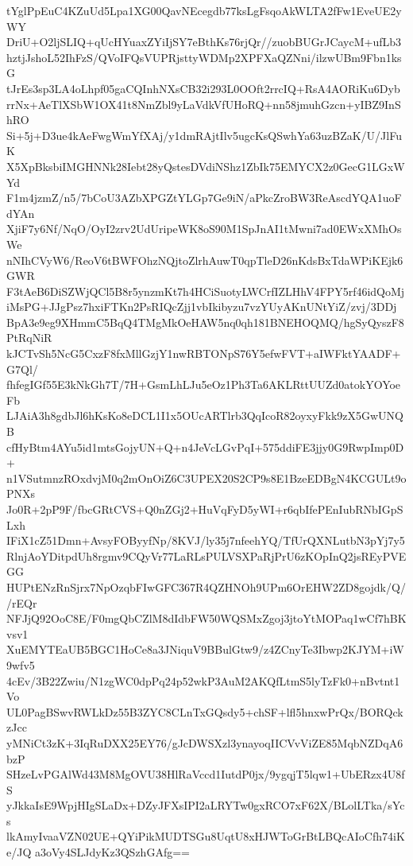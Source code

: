 tYglPpEuC4KZuUd5Lpa1XG00QavNEcegdb77ksLgFsqoAkWLTA2fFw1EveUE2yWY
DriU+O2ljSLIQ+qUcHYuaxZYiIjSY7eBthKs76rjQr//zuobBUGrJCaycM+ufLb3
hztjJshoL52IhFzS/QVoIFQsVUPRjsttyWDMp2XPFXaQZNni/ilzwUBm9Fbn1ksG
tJrEs3sp3LA4oLhpf05gaCQInhNXsCB32i293L0OOft2rrcIQ+RsA4AORiKu6Dyb
rrNx+AeTlXSbW1OX41t8NmZbl9yLaVdkVfUHoRQ+nn58jmuhGzcn+yIBZ9InShRO
Si+5j+D3ue4kAeFwgWmYfXAj/y1dmRAjtIlv5ugcKsQSwhYa63uzBZaK/U/JlFuK
X5XpBksbiIMGHNNk28Iebt28yQstesDVdiNShz1ZbIk75EMYCX2z0GecG1LGxWYd
F1m4jzmZ/n5/7bCoU3AZbXPGZtYLGp7Ge9iN/aPkcZroBW3ReAscdYQA1uoFdYAn
XjiF7y6Nf/NqO/OyI2zrv2UdUripeWK8oS90M1SpJnAI1tMwni7ad0EWxXMhOsWe
nNIhCVyW6/ReoV6tBWFOhzNQjtoZlrhAuwT0qpTleD26nKdsBxTdaWPiKEjk6GWR
F3tAeB6DiSZWjQCl5B8r5ynzmKt7h4HCiSuotyLWCrfIZLHhV4FPY5rf46idQoMj
iMsPG+JJgPsz7hxiFTKn2PsRIQcZjj1vbIkibyzu7vzYUyAKnUNtYiZ/zvj/3DDj
BpA3e9eg9XHmmC5BqQ4TMgMkOeHAW5nq0qh181BNEHOQMQ/hgSyQyszF8PtRqNiR
kJCTvSh5NcG5CxzF8fxMllGzjY1nwRBTONpS76Y5efwFVT+aIWFktYAADF+G7Ql/
fhfegIGf55E3kNkGh7T/7H+GsmLhLJu5eOz1Ph3Ta6AKLRttUUZd0atokYOYoeFb
LJAiA3h8gdbJl6hKsKo8eDCL1I1x5OUcARTlrb3QqIcoR82oyxyFkk9zX5GwUNQB
cfHyBtm4AYu5id1mtsGojyUN+Q+n4JeVcLGvPqI+575ddiFE3jjy0G9RwpImp0D+
n1VSutmnzROxdvjM0q2mOnOiZ6C3UPEX20S2CP9s8E1BzeEDBgN4KCGULt9oPNXs
Jo0R+2pP9F/fbcGRtCVS+Q0nZGj2+HuVqFyD5yWI+r6qbIfePEnIubRNbIGpSLxh
IFiX1cZ51Dmn+AvsyFOByyfNp/8KVJ/ly35j7nfeehYQ/TfUrQXNLutbN3pYj7y5
RlnjAoYDitpdUh8rgmv9CQyVr77LaRLsPULVSXPaRjPrU6zKOpInQ2jsREyPVEGG
HUPtENzRnSjrx7NpOzqbFIwGFC367R4QZHNOh9UPm6OrEHW2ZD8gojdk/Q//rEQr
NFJjQ92OoC8E/F0mgQbCZlM8dIdbFW50WQSMxZgoj3jtoYtMOPaq1wCf7hBKvsv1
XuEMYTEaUB5BGC1HoCe8a3JNiquV9BBulGtw9/z4ZCnyTe3Ibwp2KJYM+iW9wfv5
4cEv/3B22Zwiu/N1zgWC0dpPq24p52wkP3AuM2AKQfLtmS5lyTzFk0+nBvtnt1Vo
UL0PagBSwvRWLkDz55B3ZYC8CLnTxGQsdy5+chSF+lfl5hnxwPrQx/BORQckzJcc
yMNiCt3zK+3IqRuDXX25EY76/gJcDWSXzl3ynayoqIICVvViZE85MqbNZDqA6bzP
SHzeLvPGAlWd43M8MgOVU38HlRaVccd1IutdP0jx/9ygqjT5lqw1+UbERzx4U8fS
yJkkaIsE9WpjHIgSLaDx+DZyJFXsIPI2aLRYTw0gxRCO7xF62X/BLolLTka/sYcs
lkAmyIvaaVZN02UE+QYiPikMUDTSGu8UqtU8xHJWToGrBtLBQcAIoCfh74iKe/JQ
a3oVy4SLJdyKz3QSzhGAfg==
